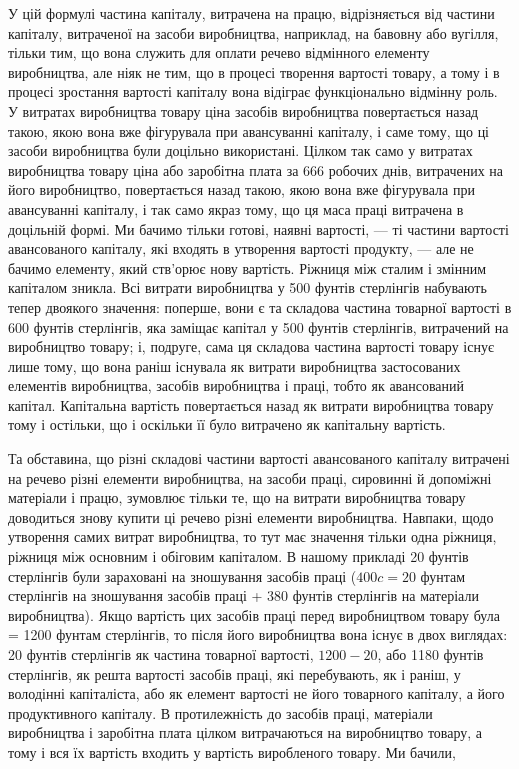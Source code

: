 
У цій формулі частина капіталу, витрачена на працю, відрізняється
від частини капіталу, витраченої на засоби виробництва,
наприклад, на бавовну або вугілля, тільки тим, що вона
служить для оплати речево відмінного елементу виробництва,
але ніяк не тим, що в процесі творення вартості товару, а тому
і в процесі зростання вартості капіталу вона відіграє функціонально
відмінну роль. У витратах виробництва товару ціна засобів
виробництва повертається назад такою, якою вона вже
фігурувала при авансуванні капіталу, і саме тому, що ці засоби
виробництва були доцільно використані. Цілком так само у витратах
виробництва товару ціна або заробітна плата за 666
робочих днів, витрачених на його виробництво, повертається
назад такою, якою вона вже фігурувала при авансуванні капіталу,
і так само якраз тому, що ця маса праці витрачена в доцільній
формі. Ми бачимо тільки готові, наявні вартості, — ті
частини вартості авансованого капіталу, які входять в утворення
вартості продукту, — але не бачимо елементу, який ств'орює
нову вартість. Ріжниця між сталим і змінним капіталом зникла.
Всі витрати виробництва у 500 фунтів стерлінгів набувають
тепер двоякого значення: поперше, вони є та складова частина
товарної вартості в 600 фунтів стерлінгів, яка заміщає капітал
у 500 фунтів стерлінгів, витрачений на виробництво товару;
і, подруге, сама ця складова частина вартості товару існує лише
тому, що вона раніш існувала як витрати виробництва застосованих
елементів виробництва, засобів виробництва і праці, тобто
як авансований капітал. Капітальна вартість повертається назад
як витрати виробництва товару тому і остільки, що і оскільки
її було витрачено як капітальну вартість.

Та обставина, що різні складові частини вартості авансованого
капіталу витрачені на речево різні елементи виробництва,
на засоби праці, сировинні й допоміжні матеріали і працю,
зумовлює тільки те, що на витрати виробництва товару доводиться
знову купити ці речево різні елементи виробництва.
Навпаки, щодо утворення самих витрат виробництва, то тут має
значення тільки одна ріжниця, ріжниця між основним і обіговим
капіталом. В нашому прикладі 20 фунтів стерлінгів були зараховані
на зношування засобів праці ($400 c = 20$ фунтам стерлінгів
на зношування засобів праці + 380 фунтів стерлінгів на
матеріали виробництва). Якщо вартість цих засобів праці перед
виробництвом товару була = 1200 фунтам стерлінгів, то після
його виробництва вона існує в двох виглядах: 20 фунтів стерлінгів
як частина товарної вартості, $1200-20$, або 1180 фунтів стерлінгів,
як решта вартості засобів праці, які перебувають, як і раніш,
у володінні капіталіста, або як елемент вартості не його
товарного капіталу, а його продуктивного капіталу. В протилежність
до засобів праці, матеріали виробництва і заробітна плата
цілком витрачаються на виробництво товару, а тому і вся їх
вартість входить у вартість виробленого товару. Ми бачили,
\parbreak{}  %
